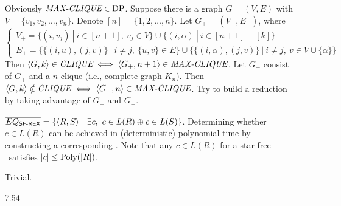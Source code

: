 \begin{itemize}
	\item[\Star 7.48]
	Obviously $\IT{MAX-CLIQUE} \in \RM{DP}$. Suppose there is a graph $G = (V, E)$ with $V = \{v_1, v_2, \dots, v_n \}$. Denote $[n] = \{1, 2, \dots, n\}$. Let $G_+ = (V_+, E_+)$, where
	$$
		\left\{
			\begin{array}{l}
				\displaystyle
				V_+ = \{ (i, v_j) \ | \ i \in [n + 1],\ v_j \in V \} \cup \{ (i, \alpha) \ | \ i \in [n+1] - [k] \} \\
				E_+ = \{ \{ (i, u), (j, v) \} \ | \ i \neq j,\ \{u, v\} \in E \} \cup \{ \{ (i, \alpha), (j, v) \} \ | \ i \neq j,\ v \in V \cup \{\alpha\} \}
			\end{array}
		\right.
	$$
	Then $\Bra{G, k} \in \IT{CLIQUE} \iff \Bra{G_+, n+1} \in \IT{MAX-CLIQUE}$. Let $G_-$ consist of $G_+$ and a $n$-clique (i.e., complete graph $K_n$). Then $\Bra{G, k} \notin \IT{CLIQUE} \iff \Bra{G_-, n} \in \IT{MAX-CLIQUE}$. Try to build a reduction by taking advantage of $G_+$ and $G_-$.
	
	\item[\Star 7.49]
	\Empty
	
	\item[\Star 7.50] 
	$\overline{EQ_{\textsf{SF-REX}}} = \{ \Bra{R, S} \ | \ \exists c,\ c \in L(R) \oplus c \in L(S) \}$. Determining whether $c \in L(R)$ can be achieved in (deterministic) polynomial time by constructing a corresponding \NFA . Note that any $c \in L(R)$ for a star-free \REX\ satisfies $|c| \leq \RM{Poly}(|R|)$.
	
	\item[\Star 7.51] 
	Trivial.
	
	\item[\Star 7.52]
	\Empty
	
	\item[\Star 7.53]
	\Empty
	
	\item[7.54]
	\Empty
	
\end{itemize}
